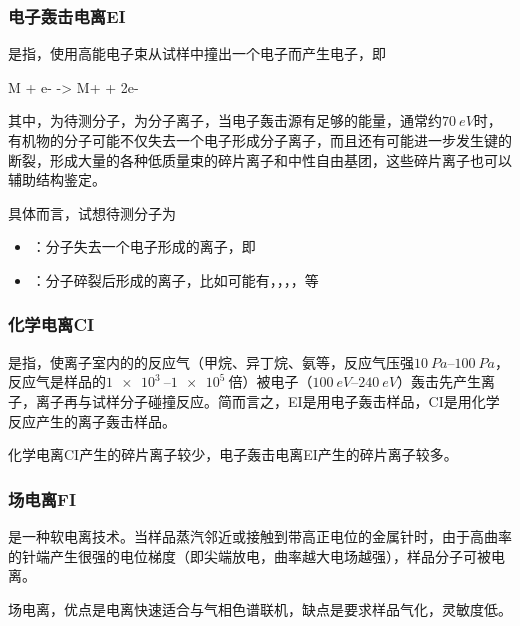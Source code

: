 \subsubsection{电子轰击电离EI}
是指，使用高能电子束从试样中撞出一个电子而产生电子，即
\begin{Chemeq}
    M + e- -> M+ + 2e-
\end{Chemeq}
其中，为待测分子，为分子离子，当电子轰击源有足够的能量，通常约$\SI{70}{eV}$时，有机物的分子可能不仅失去一个电子形成分子离子，而且还有可能进一步发生键的断裂，形成大量的各种低质量束的碎片离子和中性自由基团，这些碎片离子也可以辅助结构鉴定。

具体而言，试想待测分子为
\begin{itemize}
    \item {}：分子失去一个电子形成的离子，即
    \item {}：分子碎裂后形成的离子，比如可能有，，，，等
\end{itemize}

\subsubsection{化学电离CI}
是指，使离子室内的的反应气（甲烷、异丁烷、氨等，反应气压强$\SIrange{10}{100}{Pa}$，反应气是样品的$\SIrange{1e3}{1e5}{}$倍）被电子（$\SIrange{100}{240}{eV}$）轰击先产生离子，离子再与试样分子碰撞反应。简而言之，EI是用电子轰击样品，CI是用化学反应产生的离子轰击样品。

化学电离CI产生的碎片离子较少，电子轰击电离EI产生的碎片离子较多。

\subsubsection{场电离FI}
是一种软电离技术。当样品蒸汽邻近或接触到带高正电位的金属针时，由于高曲率的针端产生很强的电位梯度（即尖端放电，曲率越大电场越强），样品分子可被电离。

场电离，优点是电离快速适合与气相色谱联机，缺点是要求样品气化，灵敏度低。


